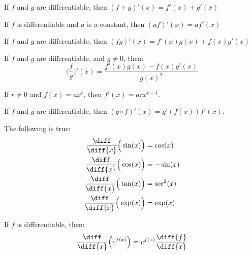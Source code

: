 \documentclass[crop=false,class=book,oneside]{standalone}                      %
\begin{document}
        \begin{theorem}
            If $f$ and $g$ are differentiable, then
            $(f+g)'(x)=f'(x)+g'(x)$
        \end{theorem}
        \begin{theorem}
            If $f$ is differentiable and $a$ is a constant,
            then $(af)'(x)=af'(x)$
        \end{theorem}
        \begin{theorem}
            If $f$ and $g$ are differentiable, then
            $(fg)'(x)=f'(x)g(x)+f(x)g'(x)$
        \end{theorem}
        \begin{theorem}
            If $f$ and $g$ are differentiable, and $g\ne{0}$,
            then:
            \begin{equation*}
                \Big(\frac{f}{g}\Big)'(x)
                =\frac{f'(x)g(x)-f(x)g'(x)}{g(x)^{2}}
            \end{equation*}
        \end{theorem}
        \begin{theorem}
            If $r\ne{0}$ and $f(x)=ax^{r}$, then
            $f'(x)=arx^{r-1}$.
        \end{theorem}
        \begin{theorem}
            If $f$ and $g$ are differentiable, then
            $(g\circ{f})'(x)=g'(f(x))f'(x)$.
        \end{theorem}
        \begin{theorem}
            The following is true:
            \begin{align}
                \frac{\diff}{\diff{x}}\Big(\sin(x)\Big)
                &=\cos(x)\\
                \frac{\diff}{\diff{x}}\Big(\cos(x)\Big)
                &=-\sin(x)\\
                \frac{\diff}{\diff{x}}\Big(\tan(x)\Big)
                &=\sec^{2}(x)\\
                \frac{\diff}{\diff{x}}\Big(\exp(x)\Big)
                &=\exp(x)
            \end{align}
        \end{theorem}
        \begin{theorem}
            If $f$ is differentiable, then:
            \begin{equation*}
                \frac{\diff}{\diff{x}}\Big(e^{f(x)}\Big)
                =e^{f(x)}\frac{\diff{f}}{\diff{x}}
            \end{equation*}
        \end{theorem}
\end{document}
